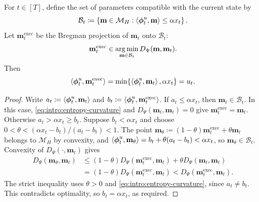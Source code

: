 \begin{Thm:Lemma}
\label{ch4:lem:availability-projection}
For $t\in[T]$, define the set of parameters compatible with the current state by
\begin{equation}
\label{ch4:eq:availability-set}
\mathcal{B}_t
\coloneqq
\left\{
\mathbf{m}\in\mathcal{M}_H:
\left\langle \boldsymbol{\phi}_t^u,\mathbf{m} \right\rangle
\le \alpha x_t
\right\}.
\end{equation}
Let $\mathbf{m}_t^{\mathrm{exec}}$ be the Bregman projection of
$\mathbf{m}_t$ onto $\mathcal{B}_t$:
\begin{equation}
\label{ch4:eq:availability-projection}
\mathbf{m}_t^{\mathrm{exec}}
\in
\operatorname*{arg\,min}_{\mathbf{m}\in\mathcal{B}_t}
D_\Psi(\mathbf{m},\mathbf{m}_t).
\end{equation}
Then
\[
\left\langle \boldsymbol{\phi}_t^u,\mathbf{m}_t^{\mathrm{exec}} \right\rangle
=
\min\!\left\{
\left\langle \boldsymbol{\phi}_t^u,\mathbf{m}_t \right\rangle,
\alpha x_t
\right\}
=u_t.
\]
\end{Thm:Lemma}

\begin{proof}
Write $a_t\coloneqq\left\langle \boldsymbol\phi_t^u,\mathbf m_t \right\rangle$ and
$b_t\coloneqq\left\langle \boldsymbol\phi_t^u,\mathbf m_t^{\mathrm{exec}} \right\rangle$.
If $a_t\le\alpha x_t$, then $\mathbf m_t\in\mathcal B_t$. In this case,
\eqref{eq:intro:entropy-curvature} and
$D_\Psi(\mathbf m_t,\mathbf m_t)=0$ give
$\mathbf m_t^{\mathrm{exec}}=\mathbf m_t$.
Otherwise $a_t>\alpha x_t\ge b_t$. Suppose $b_t<\alpha x_t$ and choose
$0<\theta<(\alpha x_t-b_t)/(a_t-b_t)<1$.
The point
$\mathbf m_\theta\coloneqq(1-\theta)\mathbf m_t^{\mathrm{exec}}+\theta\mathbf m_t$
belongs to $\mathcal M_H$ by convexity, and
$\left\langle \boldsymbol\phi_t^u,\mathbf m_\theta \right\rangle
=b_t+\theta(a_t-b_t)<\alpha x_t$, so $\mathbf m_\theta\in\mathcal B_t$.
Convexity of $D_\Psi(\cdot,\mathbf m_t)$ gives
\[
\begin{aligned}
D_\Psi(\mathbf m_\theta,\mathbf m_t)
&\le(1-\theta)D_\Psi(\mathbf m_t^{\mathrm{exec}},\mathbf m_t)
   +\theta D_\Psi(\mathbf m_t,\mathbf m_t)\\
&=(1-\theta)D_\Psi(\mathbf m_t^{\mathrm{exec}},\mathbf m_t)
<D_\Psi(\mathbf m_t^{\mathrm{exec}},\mathbf m_t).
\end{aligned}
\]
The strict inequality uses $\theta>0$ and \eqref{eq:intro:entropy-curvature}, since
$a_t\ne b_t$. This contradicts optimality, so $b_t=\alpha x_t$, as required.
\end{proof}
